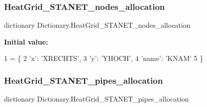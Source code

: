 \subsubsection{\texorpdfstring{Heat\+Grid\+\_\+\+S\+T\+A\+N\+E\+T\+\_\+nodes\+\_\+allocation}{HeatGrid\_STANET\_nodes\_allocation}}
{\footnotesize\ttfamily dictionary Dictionary.\+Heat\+Grid\+\_\+\+S\+T\+A\+N\+E\+T\+\_\+nodes\+\_\+allocation}

{\bfseries Initial value\+:}
\begin{DoxyCode}
1 =  \{
2                                 \textcolor{stringliteral}{'x'}: \textcolor{stringliteral}{'XRECHTS'},
3                                 \textcolor{stringliteral}{'y'}: \textcolor{stringliteral}{'YHOCH'},
4                                 \textcolor{stringliteral}{'name'}: \textcolor{stringliteral}{'KNAM'}
5                                 \}
\end{DoxyCode}
\mbox{\label{namespace_dictionary_a7c7183d62ec27e3eabf3fa48e77d7cba}} 
\subsubsection{\texorpdfstring{Heat\+Grid\+\_\+\+S\+T\+A\+N\+E\+T\+\_\+pipes\+\_\+allocation}{HeatGrid\_STANET\_pipes\_allocation}}
{\footnotesize\ttfamily dictionary Dictionary.\+Heat\+Grid\+\_\+\+S\+T\+A\+N\+E\+T\+\_\+pipes\+\_\+allocation}

